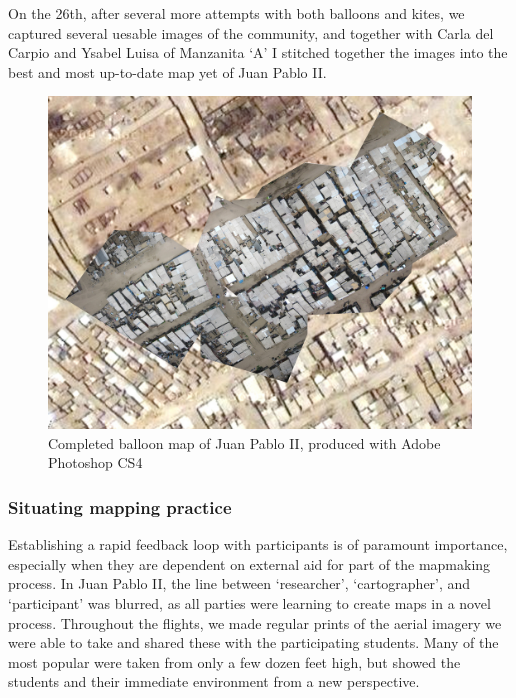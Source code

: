 \documentclass[11pt,oneside,notitlepage]{report}
\begin{document}
On the 26th, after several more attempts with both balloons and kites, we captured several uesable images of the community, and together with Carla del Carpio and Ysabel Luisa of Manzanita `A' I stitched together the images into the best and most up-to-date map yet of Juan Pablo II.  

\begin{figure}[h]
  \begin{center}
	\includegraphics[width=1\textwidth]{images/juan-pablo-final.jpg}
	\caption{Completed balloon map of Juan Pablo II, produced with Adobe Photoshop CS4}
  \end{center}
\end{figure}

\subsubsection{Situating mapping practice}

Establishing a rapid feedback loop with participants is of paramount importance, especially when they are dependent on external aid for part of the mapmaking process. In Juan Pablo II, the line between `researcher', `cartographer', and `participant' was blurred, as all parties were learning to create maps in a novel process. Throughout the flights, we made regular prints of the aerial imagery we were able to take and shared these with the participating students. Many of the most popular were taken from only a few dozen feet high, but showed the students and their immediate environment from a new perspective. 
\end{document}
